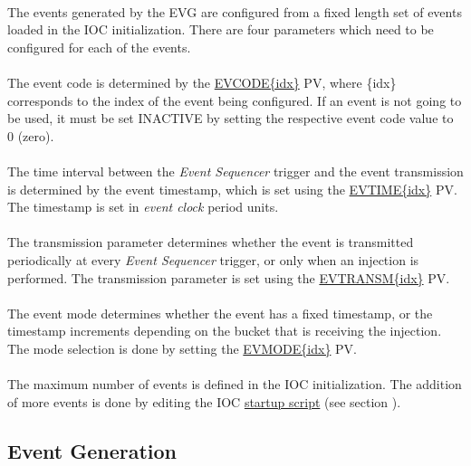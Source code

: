 \documentclass[openany]{article}
\begin{document}
		\paragraph{} The events generated by the EVG are configured from a fixed length set of events loaded in the IOC initialization. There are four parameters which need to be configured for each of the events.
		\paragraph{} The event code is determined by the \hyperref[pvgroup:evg-event]{EVCODE\{idx\}} PV, where \{idx\} corresponds to the index of the event being configured. If an event is not going to be used, it must be set INACTIVE by setting the respective event code value to 0 (zero).
		\paragraph{} The time interval between the \emph{Event Sequencer} trigger and the event transmission is determined by the event timestamp, which is set using the \hyperref[pvgroup:evg-event]{EVTIME\{idx\}} PV. The timestamp is set in \emph{event clock} period units.
		\paragraph{} The transmission parameter determines whether the event is transmitted periodically at every \emph{Event Sequencer} trigger, or only when an injection is performed. The transmission parameter is set using the \hyperref[pvgroup:evg-event]{EVTRANSM\{idx\}} PV.
		\paragraph{} The event mode determines whether the event has a fixed timestamp, or the timestamp increments depending on the bucket that is receiving the injection. The mode selection is done by setting the \hyperref[pvgroup:evg-event]{EVMODE\{idx\}} PV. 
		\paragraph{} The maximum number of events is defined in the IOC initialization. The addition of more events is done by editing the IOC \hyperref[sec:startup-script]{startup script} (see section ).

	\subsection{Event Generation}
\end{document}
